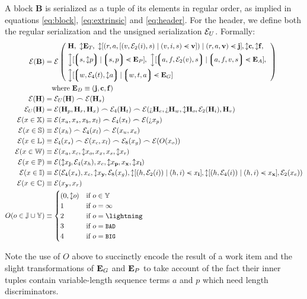 A block $\mathbf{B}$ is serialized as a tuple of its elements in regular order, as implied in equations \ref{eq:block}, \ref{eq:extrinsic} and \ref{eq:header}. For the header, we define both the regular serialization and the unsigned serialization $\mathcal{E}_U$. Formally:
\begin{align}
  \se(\mathbf{B}) &= \se\,\left\lparen\;\begin{aligned}
    &\mathbf{H},\ 
    \var{\xttickets},\ 
    \var{[(r, a, [(v, \se_2(i), s) \mid (v, i, s) \orderedin \mathbf{v}]) \mid (r, a, \mathbf{v}) \orderedin \mathbf{j}]}, \var{\mathbf{c}}, \var{\mathbf{f}},\ \\
    &\var{[\tup{s, \var{p}} \mid \tup{s, p} \orderedin \xtpreimages]},\ 
    \var{[\tup{a, f, \se_2(v), s} \mid \tup{a, f, v, s} \orderedin \xtassurances]},\ \\
    &\var{[\tup{w, \se_4(t), \var{a}} \mid \tup{w, t, a} \orderedin \xtguarantees]}
  \end{aligned}\;\right\rparen \\
  \nonumber &\quad \where \xtdisputes \equiv (\mathbf{j}, \mathbf{c}, \mathbf{f}) \\
  \se(\mathbf{H}) &= \se_U(\mathbf{H})\concat\se(\mathbf{H}_s) \\
  \se_U(\mathbf{H}) &= \se(\mathbf{H}_p,\mathbf{H}_r,\mathbf{H}_x)\concat\se_4(\mathbf{H}_t)\concat\se(\maybe{\mathbf{H}_e},\maybe{\mathbf{H}_w},\var{\mathbf{H}_o},\se_2(\mathbf{H}_i),\mathbf{H}_v)\\
  \se(x \in \mathbb{X}) &\equiv \se(x_a, x_s, x_b, x_l)\concat\se_4(x_t)\concat\se(\maybe{x_p})\\
  \se(x \in \mathbb{S}) &\equiv \se(x_h) \concat \se_4(x_l)\concat\se(x_u, x_e) \\
  \se(x \in \mathbb{L}) &\equiv \se_4(x_s)\concat\se(x_c, x_l)\concat\se_8(x_g)\concat\se(O(x_o))\\
  \se(x \in \mathbb{W}) &\equiv \se(x_a, x_c, \var{x_o}, x_x, x_s, \var{x_r}) \\
  \se(x \in \mathbb{P}) &\equiv \se(\var{x_\mathbf{j}}, \se_4(x_h), x_c, \var{x_\mathbf{p}}, x_\mathbf{x}, \var{x_\mathbf{i}}) \\
  \se(x \in \mathbb{I}) &\equiv \se(\se_4(x_s), x_c, \var{x_\mathbf{y}}, \se_8(x_g), \var{\sq{(h, \se_2(i)) \mid (h, i) \orderedin x_\mathbf{i}}}, \var{\sq{(h, \se_4(i)) \mid (h, i) \orderedin x_\mathbf{x}}}, \se_2(x_e)) \\
  \se(x \in \mathbb{C}) &\equiv \se(x_\mathbf{y}, x_r) \\
  O(o \in \mathbb{J} \cup \Y) &\equiv \begin{cases}
    (0, \var{o}) &\when o \in \Y \\
    1 &\when o = \infty \\
    2 &\when o = \panic \\
    3 &\when o = \token{BAD} \\
    4 &\when o = \token{BIG} \\
  \end{cases}
\end{align}

Note the use of $O$ above to succinctly encode the result of a work item and the slight transformations of $\mathbf{E}_G$ and $\mathbf{E}_P$ to take account of the fact their inner tuples contain variable-length sequence terms $a$ and $p$ which need length discriminators.
